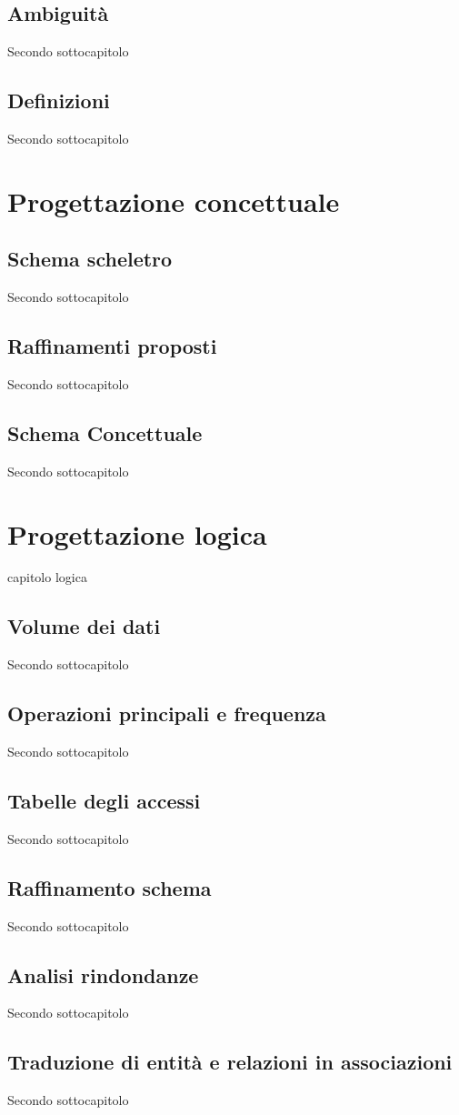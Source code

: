﻿\documentclass[a4paper,12pt]{report}
\begin{document}
\section{Ambiguità}
Secondo sottocapitolo
\section{Definizioni}
Secondo sottocapitolo


\chapter{Progettazione concettuale}
\section{Schema scheletro}
Secondo sottocapitolo
\section{Raffinamenti proposti}
Secondo sottocapitolo
\section{Schema Concettuale}
Secondo sottocapitolo


\chapter{Progettazione logica}
capitolo logica
\section{Volume dei dati}
Secondo sottocapitolo
\section{Operazioni principali e frequenza}
Secondo sottocapitolo
\section{Tabelle degli accessi}
Secondo sottocapitolo
\section{Raffinamento schema}
Secondo sottocapitolo
\section{Analisi rindondanze}
Secondo sottocapitolo
\section{Traduzione di entità e relazioni in associazioni}
Secondo sottocapitolo
\end{document}
